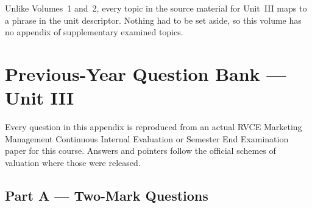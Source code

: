 \begin{keybox}
Unlike Volumes~1 and~2, every topic in the source material for Unit~III maps to a
phrase in the unit descriptor. Nothing had to be set aside, so this volume has no
appendix of supplementary examined topics.
\end{keybox}

\chapter{Previous-Year Question Bank --- Unit III}

Every question in this appendix is reproduced from an actual RVCE Marketing
Management Continuous Internal Evaluation or Semester End Examination paper for
this course. Answers and pointers follow the official schemes of valuation where
those were released.

\section*{Part A --- Two-Mark Questions}

